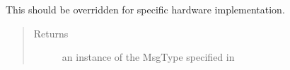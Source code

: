 \documentclass[a4paper,12pt,english]{article}
\begin{document}
\begin{fulllineitems}
\begin{fulllineitems}
This should be overridden for specific hardware implementation.
\begin{quote}\begin{description}
\item[{Returns}] \leavevmode
an instance of the MsgType specified in 

\end{description}\end{quote}

\end{fulllineitems}


\end{fulllineitems}

\label{\detokenize{osbk_devices:module-osbk_devices.actuator_base}}
\end{document}
